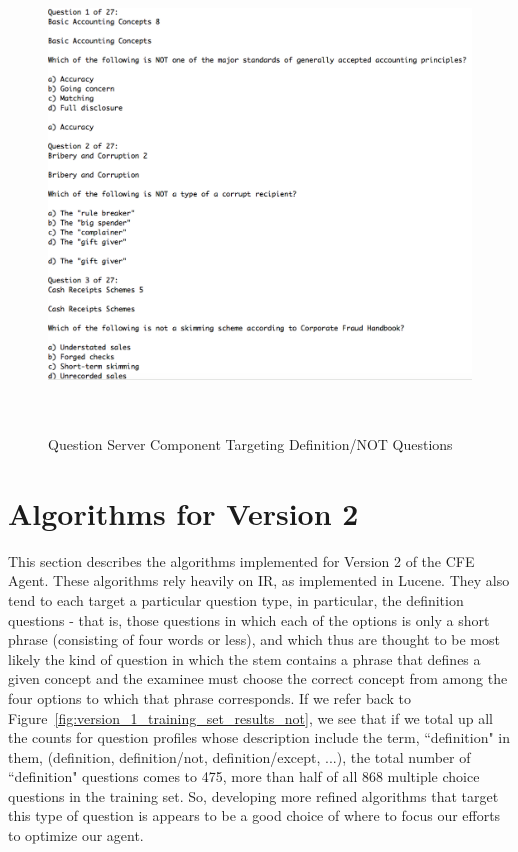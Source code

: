 \begin{figure}
\centering
\vspace{1.0in}
\includegraphics[width=125mm, height=125mm]{question_server.png}
\caption{Question Server Component Targeting Definition/NOT Questions}
\label{fig:question_server}
\end{figure}


\section{Algorithms for Version 2}

This section describes the algorithms implemented for Version 2 of the CFE Agent.  These algorithms rely heavily on IR, as implemented in Lucene.  They also tend to each target a particular question type, in particular, the definition questions - that is, those questions in which each of the options is only a short phrase (consisting of four words or less), and which thus are thought to be most likely the kind of question in which the stem contains a phrase that defines a given concept and the examinee must choose the correct concept from among the four options to which that phrase corresponds.  If we refer back to Figure~\ref{fig:version_1_training_set_results_not}, we see that if we total up all the counts for question profiles whose description include the term, ``definition" in them, (definition, definition/not, definition/except, ...), the total number of ``definition" questions comes to 475, more than half of all 868 multiple choice questions in the training set.  So, developing more refined algorithms that target this type of question is appears to be a good choice of where to focus our efforts to optimize our agent.

